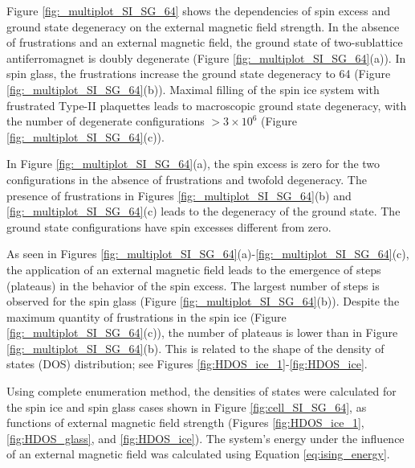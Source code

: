 \documentclass[preprint,12pt]{elsarticle}
\begin{document}
	Figure \ref{fig:_multiplot_SI_SG_64} shows the dependencies of spin excess and ground state degeneracy on the external magnetic field strength.
	In the absence of frustrations and an external magnetic field, the ground state of two-sublattice antiferromagnet is doubly degenerate (Figure \ref{fig:_multiplot_SI_SG_64}(a)).
	In spin glass, the frustrations increase the ground state degeneracy to 64 (Figure \ref{fig:_multiplot_SI_SG_64}(b)).
	Maximal filling of the spin ice system with frustrated Type-II plaquettes leads to macroscopic ground state degeneracy, with the number of degenerate configurations $> 3\times10^{6}$ (Figure \ref{fig:_multiplot_SI_SG_64}(c)).
	
	In Figure \ref{fig:_multiplot_SI_SG_64}(a), the spin excess is zero for the two configurations in the absence of frustrations and twofold degeneracy. The presence of frustrations in Figures \ref{fig:_multiplot_SI_SG_64}(b) and \ref{fig:_multiplot_SI_SG_64}(c) leads to the degeneracy of the ground state. The ground state configurations have spin excesses different from zero.
	
	As seen in Figures \ref{fig:_multiplot_SI_SG_64}(a)-\ref{fig:_multiplot_SI_SG_64}(c), the application of an external magnetic field leads to the emergence of steps (plateaus) in the behavior of the spin excess. The largest number of steps is observed for the spin glass (Figure \ref{fig:_multiplot_SI_SG_64}(b)). Despite the maximum quantity of frustrations in the spin ice (Figure \ref{fig:_multiplot_SI_SG_64}(c)), the number of plateaus is lower than in Figure \ref{fig:_multiplot_SI_SG_64}(b). This is related to the shape of the density of states (DOS) distribution; see Figures \ref{fig:HDOS_ice_1}-\ref{fig:HDOS_ice}.
	
	Using complete enumeration method, the densities of states were calculated for the spin ice and spin glass cases shown in Figure \ref{fig:cell_SI_SG_64}, as functions of external magnetic field strength (Figures \ref{fig:HDOS_ice_1}, \ref{fig:HDOS_glass}, and \ref{fig:HDOS_ice}).
	The system's energy under the influence of an external magnetic field was calculated using Equation \eqref{eq:ising_energy}.
	
\end{document}
